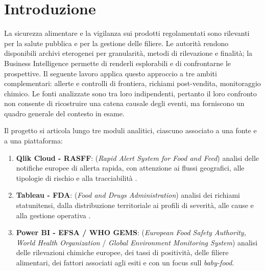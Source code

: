 \chapter{Introduzione}
\label{chap:introduction}

La sicurezza alimentare e la vigilanza sui prodotti regolamentati sono rilevanti per la salute pubblica e per la gestione delle filiere. Le autorità rendono disponibili archivi eterogenei per granularità, metodi di rilevazione e finalità; la Business Intelligence permette di renderli esplorabili e di confrontarne le prospettive. Il seguente lavoro applica questo approccio a tre ambiti complementari: allerte e controlli di frontiera, richiami post-vendita, monitoraggio chimico. Le fonti analizzate sono tra loro indipendenti, pertanto il loro confronto non consente di ricostruire una catena causale degli eventi, ma forniscono un quadro generale del contesto in esame.

Il progetto si articola lungo tre moduli analitici, ciascuno associato a una fonte e a una piattaforma:

\begin{enumerate}
    \item \textbf{Qlik Cloud - RASFF}: (\textit{Rapid Alert System for Food and Feed}) analisi delle notifiche europee di allerta rapida, con attenzione ai flussi geografici, alle tipologie di rischio e alla tracciabilità \citep{rasff_portal}.
    
    \item \textbf{Tableau - FDA}: (\textit{Food and Drugs Administration}) analisi dei richiami statunitensi, dalla distribuzione territoriale ai profili di severità, alle cause e alla gestione operativa \citep{fda_recalls_portal,fda_recall_classes}.
    
    \item \textbf{Power BI - EFSA / WHO GEMS}: (\textit{European Food Safety Authority, World Health Organization} / \textit{Global Environment Monitoring System}) analisi delle rilevazioni chimiche europee, dei tassi di positività, delle filiere alimentari, dei fattori associati agli esiti \citep{who_gems_efsa} e con un focus sull \textit{baby-food}.
\end{enumerate}
